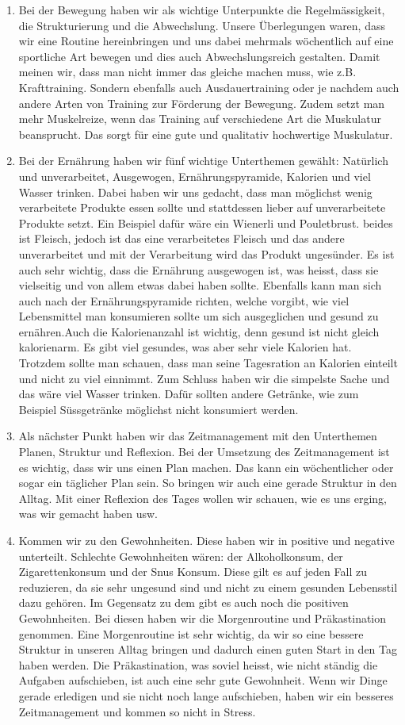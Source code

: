 \begin{enumerate}
  \item Bei der Bewegung haben wir als wichtige Unterpunkte die Regelmässigkeit, die Strukturierung und die Abwechslung. Unsere Überlegungen waren, dass wir eine Routine hereinbringen und uns dabei mehrmals wöchentlich auf eine sportliche Art bewegen und dies auch Abwechslungsreich gestalten. Damit meinen wir, dass man nicht immer das gleiche machen muss, wie z.B. Krafttraining. Sondern ebenfalls auch Ausdauertraining oder je nachdem auch andere Arten von Training zur Förderung der Bewegung. Zudem setzt man mehr Muskelreize, wenn das Training auf verschiedene Art die Muskulatur beansprucht. Das sorgt für eine gute und qualitativ hochwertige Muskulatur.
  \item Bei der Ernährung haben wir fünf wichtige Unterthemen gewählt: Natürlich und unverarbeitet, Ausgewogen, Ernährungspyramide, Kalorien und viel Wasser trinken. Dabei haben wir uns gedacht, dass man möglichst wenig verarbeitete Produkte essen sollte und stattdessen lieber auf unverarbeitete Produkte setzt. Ein Beispiel dafür wäre ein Wienerli und Pouletbrust. beides ist Fleisch, jedoch ist das eine verarbeitetes Fleisch und das andere unverarbeitet und mit der Verarbeitung wird das Produkt ungesünder. Es ist auch sehr wichtig, dass die Ernährung ausgewogen ist, was heisst, dass sie vielseitig und von allem etwas dabei haben sollte. Ebenfalls kann man sich auch nach der Ernährungspyramide richten, welche vorgibt, wie viel Lebensmittel man konsumieren sollte um sich ausgeglichen und gesund zu ernähren.Auch die Kalorienanzahl ist wichtig, denn gesund ist nicht gleich kalorienarm. Es gibt viel gesundes, was aber sehr viele Kalorien hat. Trotzdem sollte man schauen, dass man seine Tagesration an Kalorien einteilt und nicht zu viel einnimmt. Zum Schluss haben wir die simpelste Sache und das wäre viel Wasser trinken. Dafür sollten andere Getränke, wie zum Beispiel Süssgetränke möglichst nicht konsumiert werden.
  \item Als nächster Punkt haben wir das Zeitmanagement mit den Unterthemen Planen, Struktur und Reflexion. Bei der Umsetzung des Zeitmanagement ist es wichtig, dass wir uns einen Plan machen. Das kann ein wöchentlicher oder sogar ein täglicher Plan sein. So bringen wir auch eine gerade Struktur in den Alltag. Mit einer Reflexion des Tages wollen wir schauen, wie es uns erging, was wir gemacht haben usw. 
  \item Kommen wir zu den Gewohnheiten. Diese haben wir in positive und negative unterteilt. Schlechte Gewohnheiten wären: der Alkoholkonsum, der Zigarettenkonsum und der Snus Konsum. Diese gilt es auf jeden Fall zu reduzieren, da sie sehr ungesund sind und nicht zu einem gesunden Lebensstil dazu gehören. Im Gegensatz zu dem gibt es auch noch die positiven Gewohnheiten. Bei diesen haben wir die Morgenroutine und Präkastination genommen. Eine Morgenroutine ist sehr wichtig, da wir so eine bessere Struktur in unseren Alltag bringen und dadurch einen guten Start in den Tag haben werden. Die Präkastination, was soviel heisst, wie nicht ständig die Aufgaben aufschieben, ist auch eine sehr gute Gewohnheit. Wenn wir Dinge gerade erledigen und sie nicht noch lange aufschieben, haben wir ein besseres Zeitmanagement und kommen so nicht in Stress. 

\end{enumerate}
